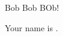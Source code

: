 \documentclass[char]{guildcamp1}
\begin{document}
\name{\cBob{}}



Bob Bob BOb!

Your name is \cBob{\they}.
\end{document}
